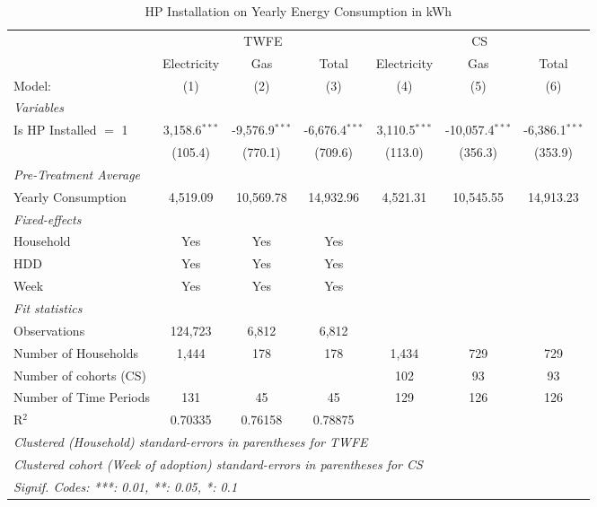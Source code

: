 
\begin{table}[htbp]
   \caption{\label{tab:hp-did-overall-conso-detailed} HP Installation on Yearly Energy Consumption in kWh}
   \centering
   \begin{tabular}{lcccccc}
      \tabularnewline \midrule \midrule
       & \multicolumn{3}{c}{TWFE} & \multicolumn{3}{c}{CS} \\ 
                                     & Electricity     & Gas              & Total            & Electricity     & Gas              & Total \\   
      Model:                         & (1)             & (2)              & (3)              & (4)             & (5)              & (6)\\  
      \midrule
      \emph{Variables}\\
      Is HP Installed $=$ 1           &  3,158.6$^{***}$  &  -9,576.9$^{***}$  &  -6,676.4$^{***}$  & 3,110.5$^{***}$ & -10,057.4$^{***}$ & -6,386.1$^{***}$ \\
                                      &  (105.4)          &  (770.1)           &  (709.6)           & (113.0) & (356.3) & (353.9) \\
      \midrule
\emph{Pre-Treatment Average}\\
      Yearly Consumption              &  4,519.09         &  10,569.78         &  14,932.96         & 4,521.31 & 10,545.55 & 14,913.23 \\
\midrule
      \emph{Fixed-effects}\\
      Household                       &  Yes              &  Yes               &  Yes               &  &  &  \\
      HDD                             &  Yes              &  Yes               &  Yes               &  &  &  \\
      Week                            &  Yes              &  Yes               &  Yes               &  &  &  \\
      \midrule
      \emph{Fit statistics}\\
      Observations                    &  124,723          &  6,812             &  6,812             &  &  &  \\
      Number of Households  &  1,444            &  178               &  178               & 1,434 & 729 & 729 \\
Number of cohorts (CS) & & & & 102 & 93 & 93 \\
      Number of Time Periods          &  131              &  45                &  45                & 129 & 126 & 126 \\
      R$^2$                           &  0.70335          &  0.76158           &  0.78875           &  &  &  \\
      \midrule \midrule
\multicolumn{10}{l}{\emph{Clustered (Household) standard-errors in parentheses for TWFE}}\\
\multicolumn{10}{l}{\emph{Clustered cohort (Week of adoption) standard-errors in parentheses for CS}}\\
      \multicolumn{7}{l}{\emph{Signif. Codes: ***: 0.01, **: 0.05, *: 0.1}}\\
   \end{tabular}
\end{table}


